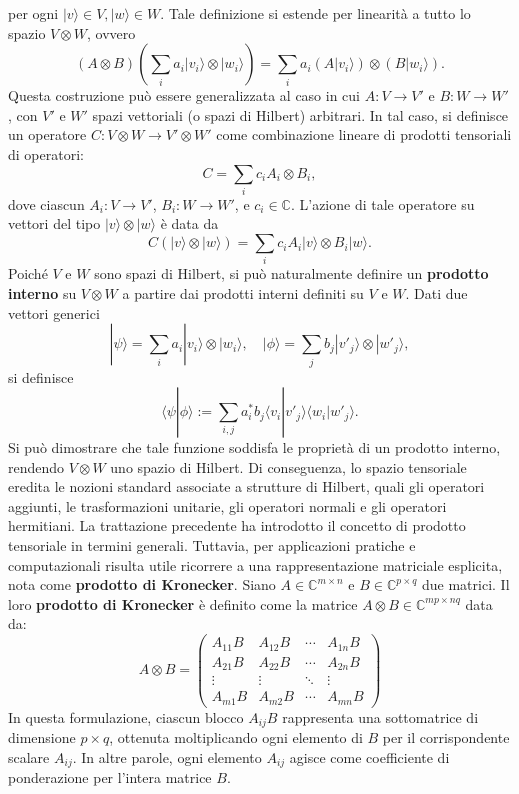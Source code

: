 \documentclass[a4paper,12pt]{report}
\theoremstyle{plain}
\begin{document}
per ogni $|v\rangle \in V, |w\rangle \in W$. Tale definizione si estende per linearità a tutto lo spazio $V \otimes W$, ovvero
$$ (A \otimes B) \left( \sum_i a_i |v_i\rangle \otimes |w_i\rangle \right) = \sum_i a_i (A|v_i\rangle) \otimes (B|w_i\rangle). $$
Questa costruzione può essere generalizzata al caso in cui $A : V \to V'$ e $B : W \to W'$, con $V'$ e $W'$ spazi vettoriali (o spazi di Hilbert) arbitrari. In tal caso, si definisce un operatore $C : V \otimes W \to V' \otimes W'$ come combinazione lineare di prodotti tensoriali di operatori:
$$ C = \sum_i c_i A_i \otimes B_i, $$
dove ciascun $A_i : V \to V'$, $B_i : W \to W'$, e $c_i \in \mathbb{C}$. L'azione di tale operatore su vettori del tipo $|v\rangle \otimes |w\rangle$ è data da
$$ C(|v\rangle \otimes |w\rangle) = \sum_i c_i A_i |v\rangle \otimes B_i |w\rangle. $$
Poiché $V$ e $W$ sono spazi di Hilbert, si può naturalmente definire un \textbf{prodotto interno} su $V \otimes W$ a partire dai prodotti interni definiti su $V$ e $W$. Dati due vettori generici
$$ |\psi\rangle = \sum_i a_i |v_i\rangle \otimes |w_i\rangle, \quad |\phi\rangle = \sum_j b_j |v'_j\rangle \otimes |w'_j\rangle, $$
si definisce
$$ \langle\psi|\phi\rangle := \sum_{i,j} a_i^* b_j \langle v_i|v'_j\rangle \langle w_i|w'_j\rangle. $$
Si può dimostrare che tale funzione soddisfa le proprietà di un prodotto interno, rendendo $V \otimes W$ uno spazio di Hilbert. Di conseguenza, lo spazio tensoriale eredita le nozioni standard associate a strutture di Hilbert, quali gli operatori aggiunti, le trasformazioni unitarie, gli operatori normali e gli operatori hermitiani.
La trattazione precedente ha introdotto il concetto di prodotto tensoriale in termini generali. Tuttavia, per applicazioni pratiche e computazionali risulta utile ricorrere a una rappresentazione matriciale esplicita, nota come \textbf{prodotto di Kronecker}.
Siano \( A \in \mathbb{C}^{m \times n} \) e \( B \in \mathbb{C}^{p \times q} \) due matrici. Il loro \textbf{prodotto di Kronecker} è definito come la matrice \( A \otimes B \in \mathbb{C}^{mp \times nq} \) data da:
\[
A \otimes B = 
\begin{pmatrix}
A_{11}B & A_{12}B & \cdots & A_{1n}B \\
A_{21}B & A_{22}B & \cdots & A_{2n}B \\
\vdots & \vdots & \ddots & \vdots \\
A_{m1}B & A_{m2}B & \cdots & A_{mn}B
\end{pmatrix}
\]
In questa formulazione, ciascun blocco \( A_{ij}B \) rappresenta una sottomatrice di dimensione \( p \times q \), ottenuta moltiplicando ogni elemento di \( B \) per il corrispondente scalare \( A_{ij} \). In altre parole, ogni elemento \( A_{ij} \) agisce come coefficiente di ponderazione per l'intera matrice \( B \).
\end{document}
